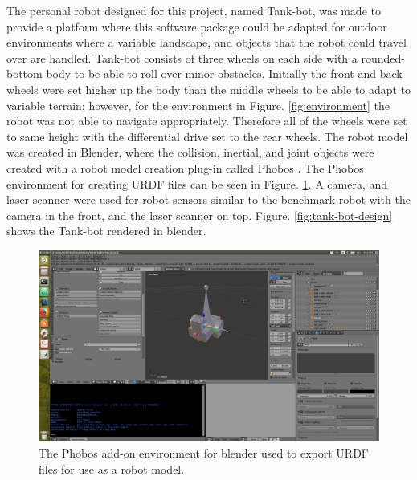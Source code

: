 \documentclass[10pt,journal,compsoc]{IEEEtran}
\begin{document}
The personal robot designed for this project, named Tank-bot, was made to provide a platform where this software package could be adapted for outdoor environments where a variable landscape, and objects that the robot could travel over are handled. Tank-bot consists of three wheels on each side with a rounded-bottom body to be able to roll over minor obstacles. Initially the front and back wheels were set higher up the body than the middle wheels to be able to adapt to variable terrain; however, for the environment in Figure. \ref{fig:environment} the robot was not able to navigate appropriately. Therefore all of the wheels were set to same height with the differential drive set to the rear wheels. The robot model was created in Blender, where the collision, inertial, and joint objects were created with a robot model creation plug-in called Phobos \cite{phobos}. The Phobos environment for creating URDF files can be seen in Figure. \ref{fig:phobos-env}. A camera, and laser scanner were used for robot sensors similar to the benchmark robot with the camera in the front, and the laser scanner on top. Figure. \ref{fig:tank-bot-design} shows the Tank-bot rendered in blender.

\begin{figure}[thpb]
    \centering
    \includegraphics[width=\linewidth]{../img/phobos_env.png}
    \caption{The Phobos add-on environment for blender used to export URDF files for use as a robot model.}
    \label{fig:phobos-env}
\end{figure}
\end{document}
